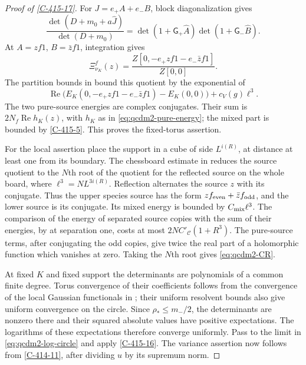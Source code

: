 \documentclass[11pt,letterpaper,reqno]{amsart}
\theoremstyle{definition}
\theoremstyle{remark}
\begin{document}
\begin{proof}[Proof of \cref{C-415-17}]
For $J=e_+A+e_-B$, block diagonalization gives
\begin{equation}\label{C-415-13}
 \frac{\det(D+m_0+a\hat J)}{\det(D+m_0)}
       =\det(1+\mathsf G_+\hat A)
        \det(1+\mathsf G_-\hat B).
\end{equation}
At $A=zf1$, $B=\bar zf1$, integration gives
\[
 \Xi_{\nu_K}^f(z)
  =\frac{Z[0,-e_+zf1-e_-\bar zf1]}{Z[0,0]}.
\]
The partition bounds in \cite[Prop. 10.14]{QCDM1} bound this quotient
by the exponential of
\[
 \operatorname{Re}\bigl(E_K(0,-e_+zf1-e_-\bar zf1)-E_K(0,0)\bigr)
       +c_V(g)\ell^3.
\]
The two pure-source energies are complex conjugates.  Their sum
is $2N_f\operatorname{Re}h_K(z)$, with $h_K$ as in
\eqref{eq:qcdm2-pure-energy}; the mixed part is bounded by
\cref{C-415-5}.  This proves the fixed-torus assertion.

For the local assertion place the support in a cube of side
$L^{i(R)}$, at distance at least one from its boundary.  The
chessboard estimate in \cite[proof of Prop. 10.17]{QCDM1} reduces the
source quotient to the $N$th root of the quotient for the reflected
source on the whole board, where $\ell^3=NL^{3i(R)}$.
Reflection alternates the source $z$ with its conjugate.  Thus the
upper species source has the form
$zf_{\rm even}+\bar zf_{\rm odd}$, and the lower source is its
conjugate.  Its mixed energy is bounded by $C_{\rm mix}\ell^3$.
The comparison of the energy of separated source copies with the
sum of their energies, by
\cite[Prop. 10.16 and equation (46)]{QCDM1} at separation
one, costs at most
$2NC'_{\mathscr C}(1+R^3)$.  The pure-source terms, after conjugating
the odd copies, give twice the real part of a holomorphic function
which vanishes at zero.  Taking the $N$th root gives
\eqref{eq:qcdm2-CR}.

At fixed $K$ and fixed support the determinants are polynomials of
a common finite degree.  Torus convergence of their coefficients
follows from the convergence of the local Gaussian functionals
in \cite[Prop. 2.5]{QCDM1}; their uniform resolvent bounds also
give uniform convergence on the circle.  Since
$\rho_*\le{m_-}/2$, the determinants are nonzero there
and their squared absolute values have positive expectations.
The logarithms of these expectations therefore
converge uniformly.  Pass to the limit in
\eqref{eq:qcdm2-log-circle} and apply \cref{C-415-16}.
The variance assertion now follows from \cref{C-414-11}, after
dividing $u$ by its supremum norm.
\end{proof}
\end{document}
